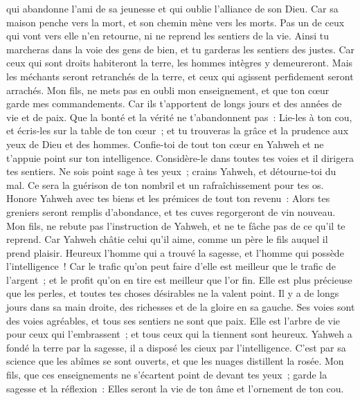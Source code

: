 \begin{multicols}{2}
qui abandonne l'ami de sa jeunesse et qui oublie l'alliance de son Dieu.
Car sa maison penche vers la mort, et son chemin mène vers les morts.
Pas un de ceux qui vont vers elle n'en retourne, ni ne reprend les sentiers de la vie.
Ainsi tu marcheras dans la voie des gens de bien, et tu garderas les sentiers des justes.
Car ceux qui sont droits habiteront la terre, les hommes intègres y demeureront.
Mais les méchants seront retranchés de la terre, et ceux qui agissent perfidement seront arrachés.
\VerseOne{}Mon fils, ne mets pas en oubli mon enseignement, et que ton cœur garde mes commandements.
Car ils t'apportent de longs jours et des années de vie et de paix.
Que la bonté et la vérité ne t'abandonnent pas~: Lie-les à ton cou, et écris-les sur la table de ton cœur~;
et tu trouveras la grâce et la prudence aux yeux de Dieu et des hommes.
Confie-toi de tout ton cœur en Yahweh et ne t'appuie point sur ton intelligence.
Considère-le dans toutes tes voies et il dirigera tes sentiers.
Ne sois point sage à tes yeux~; crains Yahweh, et détourne-toi du mal.
Ce sera la guérison de ton nombril et un rafraîchissement pour tes os.
Honore Yahweh avec tes biens et les prémices de tout ton revenu~:
Alors tes greniers seront remplis d'abondance, et tes cuves regorgeront de vin nouveau.
Mon fils, ne rebute pas l'instruction de Yahweh, et ne te fâche pas de ce qu'il te reprend.
Car Yahweh châtie celui qu'il aime, comme un père le fils auquel il prend plaisir.
Heureux l'homme qui a trouvé la sagesse, et l'homme qui possède l'intelligence~!
Car le trafic qu'on peut faire d'elle est meilleur que le trafic de l'argent~; et le profit qu'on en tire est meilleur que l'or fin.
Elle est plus précieuse que les perles, et toutes tes choses désirables ne la valent point.
Il y a de longs jours dans sa main droite, des richesses et de la gloire en sa gauche.
Ses voies sont des voies agréables, et tous ses sentiers ne sont que paix.
Elle est l'arbre de vie pour ceux qui l'embrassent~; et tous ceux qui la tiennent sont heureux.
Yahweh a fondé la terre par la sagesse, il a disposé les cieux par l'intelligence.
C'est par sa science que les abîmes se sont ouverts, et que les nuages distillent la rosée.
Mon fils, que ces enseignements ne s'écartent point de devant tes yeux~; garde la sagesse et la réflexion~:
Elles seront la vie de ton âme et l'ornement de ton cou.

\end{multicols}
